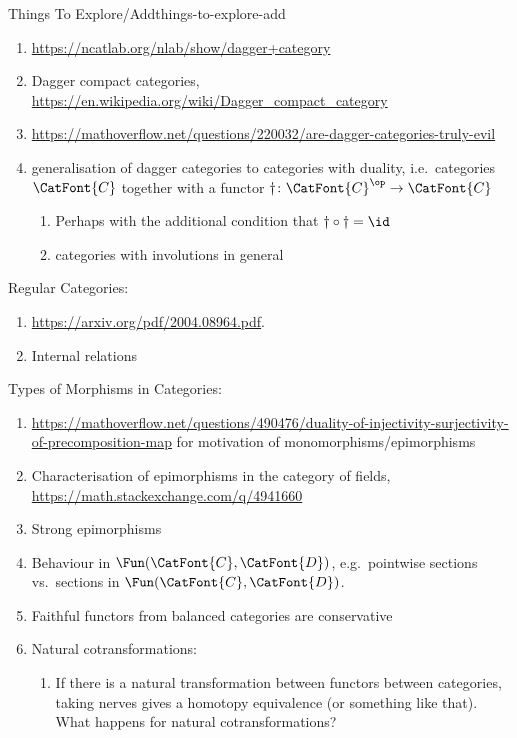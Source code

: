 \begin{remark}{Things To Explore/Add}{things-to-explore-add}
\begin{enumerate}
\begin{enumerate}
                \item \url{https://ncatlab.org/nlab/show/dagger+category}
                \item Dagger compact categories, \url{https://en.wikipedia.org/wiki/Dagger_compact_category}
                \item \url{https://mathoverflow.net/questions/220032/are-dagger-categories-truly-evil}
                \item generalisation of dagger categories to categories with duality, i.e.\ categories $\CatFont{C}$ together with a functor $\dagger\colon\CatFont{C}^{\op}\to\CatFont{C}$
                    \begin{enumerate}
                        \item Perhaps with the additional condition that $\dagger\circ\dagger=\id$
                        \item categories with involutions in general
                    \end{enumerate}
            \end{enumerate}
    \end{enumerate}
    Regular Categories:
    \begin{enumerate}
        \item \url{https://arxiv.org/pdf/2004.08964.pdf}.
        \item Internal relations
    \end{enumerate}
    Types of Morphisms in Categories:
    \begin{enumerate}
        \item \url{https://mathoverflow.net/questions/490476/duality-of-injectivity-surjectivity-of-precomposition-map} for motivation of monomorphisms/epimorphisms
        \item Characterisation of epimorphisms in the category of fields, \url{https://math.stackexchange.com/q/4941660}
        \item Strong epimorphisms
        \item Behaviour in $\Fun(\CatFont{C},\CatFont{D})$, e.g.\ pointwise sections vs.\ sections in $\Fun(\CatFont{C},\CatFont{D})$.
        \item Faithful functors from balanced categories are conservative
        \item Natural cotransformations:
            \begin{enumerate}
                \item If there is a natural transformation between functors between categories, taking nerves gives a homotopy equivalence (or something like that). What happens for natural cotransformations?

\end{enumerate}
\end{enumerate}
\end{remark}
